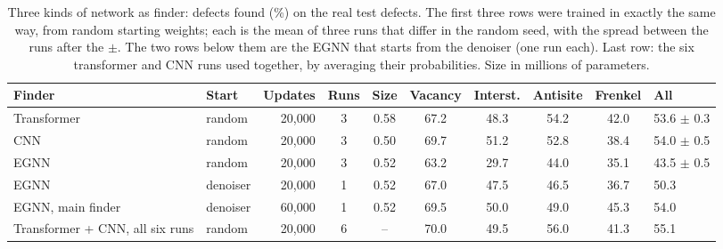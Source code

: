 \begin{table}[t]
\centering
\caption{Three kinds of network as finder: defects found (\%) on the real test defects. The first three rows were trained in exactly the same way, from random starting weights; each is the mean of three runs that differ in the random seed, with the spread between the runs after the $\pm$. The two rows below them are the EGNN that starts from the denoiser (one run each). Last row: the six transformer and CNN runs used together, by averaging their probabilities. Size in millions of parameters.}
\label{tab:finders}
\footnotesize\setlength{\tabcolsep}{3.2pt}
\begin{tabularx}{\linewidth}{@{}>{\raggedright\arraybackslash}Xlrccccccl@{}}
\toprule
Finder & Start & Updates & Runs & Size & Vacancy & Interst. & Antisite & Frenkel & All \\
\midrule
Transformer & random & 20,000 & 3 & 0.58 & 67.2 & 48.3 & 54.2 & 42.0 & 53.6 $\pm$ 0.3 \\
CNN & random & 20,000 & 3 & 0.50 & 69.7 & 51.2 & 52.8 & 38.4 & 54.0 $\pm$ 0.5 \\
\addlinespace
EGNN & random & 20,000 & 3 & 0.52 & 63.2 & 29.7 & 44.0 & 35.1 & 43.5 $\pm$ 0.5 \\
EGNN & denoiser & 20,000 & 1 & 0.52 & 67.0 & 47.5 & 46.5 & 36.7 & 50.3 \\
EGNN, main finder & denoiser & 60,000 & 1 & 0.52 & 69.5 & 50.0 & 49.0 & 45.3 & 54.0 \\
\addlinespace
Transformer + CNN, all six runs & random & 20,000 & 6 & -- & 70.0 & 49.5 & 56.0 & 41.3 & 55.1 \\
\bottomrule
\end{tabularx}
\end{table}
